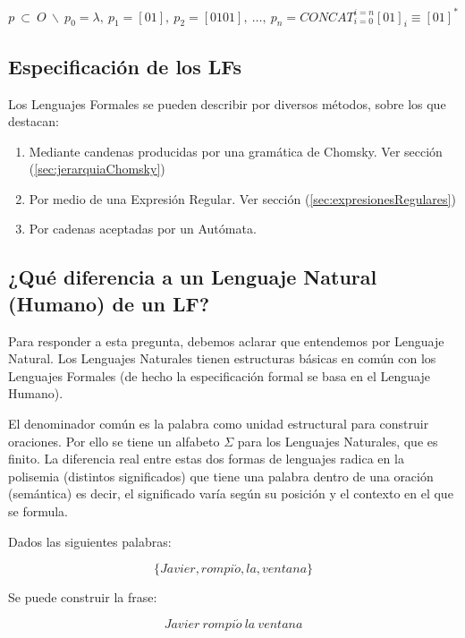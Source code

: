 {\begin{equation}
p\ \subset\ O\ \backslash\ p_0 = \lambda,\ p_1 =[01],\ p_2=[0101],\ \ldots,\ p_n
= {CONCAT}_{i = 0}^{i = n}{{[01]}_i} \equiv {[01]}^*
\end{equation}


\subsection{Especificación de los LFs}

Los Lenguajes Formales se pueden describir por diversos métodos, sobre los que
destacan:

\begin{enumerate}
\item Mediante candenas producidas por una gramática de Chomsky. Ver sección
(\ref{sec:jerarquiaChomsky})
\item Por medio de una Expresión Regular. Ver sección
(\ref{sec:expresionesRegulares})
\item Por cadenas aceptadas por un Autómata.
\end{enumerate}

\subsection{¿Qué diferencia a un Lenguaje Natural (Humano) de un LF?}

Para responder a esta pregunta, debemos aclarar que entendemos por Lenguaje
Natural. Los Lenguajes Naturales tienen estructuras básicas en común con los
Lenguajes Formales (de hecho la especificación formal se basa en el Lenguaje
Humano).

El denominador común es la palabra como unidad estructural para construir
oraciones. Por ello se tiene un alfabeto $\Sigma$ para los Lenguajes Naturales, que es
finito. La diferencia real entre estas dos formas de lenguajes radica en la
polisemia (distintos significados) que tiene una palabra dentro de una oración
(semántica) es decir, el significado varía según su posición y el contexto en el
que se formula.

\ejem Dados las siguientes palabras: 

\begin{equation}
\{Javier,rompi\acute{o},la,ventana\} 
\end{equation}

Se puede construir la frase:

\begin{equation}
Javier\ rompi\acute{o}\ la\ ventana 
\end{equation} 

}

